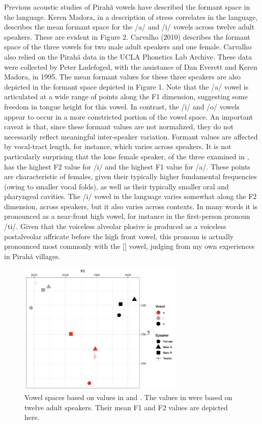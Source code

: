 \documentclass[output=paper,colorlinks,citecolor=brown
]{langscibook}
\begin{document}
    Previous acoustic studies of Pirahã vowels have described the formant space in the language. Keren Madora, in a description of stress correlates in the language, describes the mean formant space for the /a/ and /i/ vowels across twelve adult speakers.\cite{everett1998acoustic} These are evident in Figure 2. Carvalho (2010) describes the formant space of the three vowels for two male adult speakers and one female.\cite{de2010vowel} Carvalho also relied on the Pirahã data in the UCLA Phonetics Lab Archive. These data were collected by Peter Ladefoged, with the assistance of Dan Everett and Keren Madora, in 1995. The mean formant values for these three speakers are also depicted in the formant space depicted in Figure 1. Note that the /a/ vowel is articulated at a wide range of points along the F1 dimension, suggesting some freedom in tongue height for this vowel. In contrast, the /i/ and /o/ vowels appear to occur in a more constricted portion of the vowel space. An important caveat is that, since these formant values are not normalized, they do not necessarily reflect meaningful inter-speaker variation. Formant values are affected by vocal-tract length, for instance, which varies across speakers. It is not particularly surprising that the lone female speaker, of the three examined in \cite{de2010vowel}, has the highest F2 value for /i/ and the highest F1 value for /a/. These points are characteristic of females, given their typically higher fundamental frequencies (owing to smaller vocal folds), as well as their typically smaller oral and pharyngeal cavities. The /i/ vowel in the language varies somewhat along the F2 dimension, across speakers, but it also varies across contexts. In many words it is pronounced as a near-front high vowel, for instance in the first-person pronoun /ti/. Given that the voiceless alveolar plosive is produced as a voiceless postalveolar affricate before the high front vowel, this pronoun is actually pronounced most commonly with the [] vowel, judging from my own experiences in Pirahã villages.
\begin{figure}
\centering
\includegraphics[width=0.7\textwidth]{everett_figure2.png}
\caption{\label{fig:Figure 2}Vowel spaces based on values in \cite{everett1998acoustic} and \cite{de2010vowel}. The values in \cite{everett1998acoustic} were based on twelve adult speakers. Their mean F1 and F2 values are depicted here.}
\end{figure}
\end{document}
